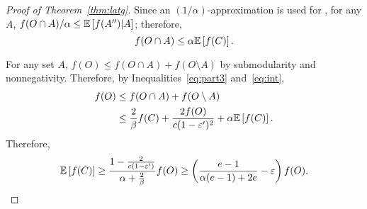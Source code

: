 \begin{proof}[Proof of Theorem~\ref{thm:latg}]
Since an $(1/\alpha)$-approximation is used 
for \unc, for any $A$, $f(O \cap A) / \alpha \le \mathbb{E} \left[  f(A'') | A  \right]$; therefore, 
\begin{equation} \label{eq:int}
f( O \cap A ) \le \alpha \mathbb{E} \left[ f(C) \right].
\end{equation}

For any set $A$, $f(O) \le f(O \cap A) + f(O \setminus A)$
by submodularity and nonnegativity. 
Therefore, by Inequalities~\ref{eq:part3} and~\ref{eq:int},
\begin{align*}
f(O) &\le f(O \cap A) + f(O \setminus A)\\
&\le \frac{2}{\beta} f(C) + \frac{2f(O)}{c(1 - \varepsilon')^2} + 
\alpha \mathbb{E} \left[ f(C) \right].
\end{align*}
Therefore,
$$
  \mathbb{E} \left[ f(C) \right]\ge \frac{1-\frac{2}{c(1-\varepsilon')}}{\alpha+\frac{2}{\beta}}f(O)
  \ge \left(\frac{e-1}{\alpha(e-1)+2e}-\varepsilon\right)f(O).
  $$

\end{proof}

